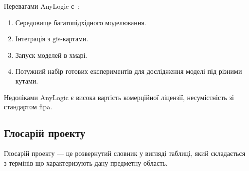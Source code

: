 Перевагами AnyLogic є~\cite{anylogic}:
\begin{enumerate}
	\item Середовище багатопідхідного моделювання.
	\item Інтеграція з \acrshort{gis}-картами.
	\item Запуск моделей в хмарі.
	\item Потужний набір готових експериментів для дослідження моделі під різними кутами.
\end{enumerate}

Недоліками AnyLogic є висока вартість комерційної ліцензії, несумістність зі стандартом \acrshort{fipa}.

\subsection{Глосарій проекту}
Глосарій проекту --- це розвернутий словник у вигляді таблиці, який складається з термінів що характеризують дану предметну область.


